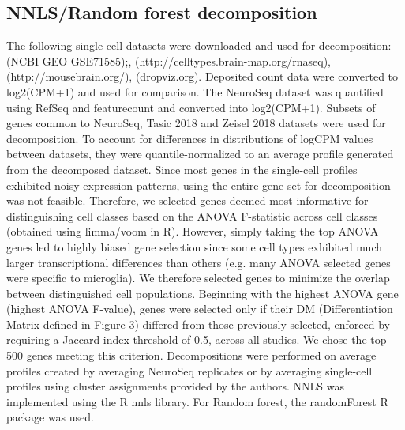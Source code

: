 \subsection{NNLS/Random forest decomposition}
The following single-cell datasets were downloaded and used for decomposition: \cite{Tasic_2016} (NCBI GEO GSE71585);, \cite{Tasic_2018}  (http://celltypes.brain-map.org/rnaseq), \cite{Zeisel_2018} (http://mousebrain.org/), \cite{Saunders_2018} (dropviz.org). Deposited count data were converted to log2(CPM+1) and used for comparison. The NeuroSeq dataset was quantified using RefSeq and featurecount \citep{Liao_2013} and converted into log2(CPM+1). Subsets of genes common to NeuroSeq, Tasic 2018 and Zeisel 2018 datasets were used for decomposition. To account for differences in distributions of logCPM values between datasets, they were quantile-normalized to an average profile generated from the decomposed dataset. Since most genes in the single-cell profiles exhibited noisy expression patterns, using the entire gene set for decomposition was not feasible. Therefore, we selected genes deemed most informative for distinguishing cell classes based on the ANOVA F-statistic across cell classes (obtained using limma/voom in R). However, simply taking the top ANOVA genes led to highly biased gene selection since some cell types exhibited much larger transcriptional differences than others (e.g. many ANOVA selected genes were specific to microglia). We therefore selected genes to minimize the overlap between distinguished cell populations. Beginning with the highest ANOVA gene (highest ANOVA F-value), genes were selected only if their DM (Differentiation Matrix defined in Figure 3) differed from those previously selected, enforced by requiring a Jaccard index threshold of 0.5, across all studies. We chose the top 500 genes meeting this criterion. Decompositions were performed on average profiles created by averaging NeuroSeq replicates or by averaging single-cell profiles using cluster assignments provided by the authors. NNLS was implemented using the R nnls library. For Random forest, the randomForest R package was used.
